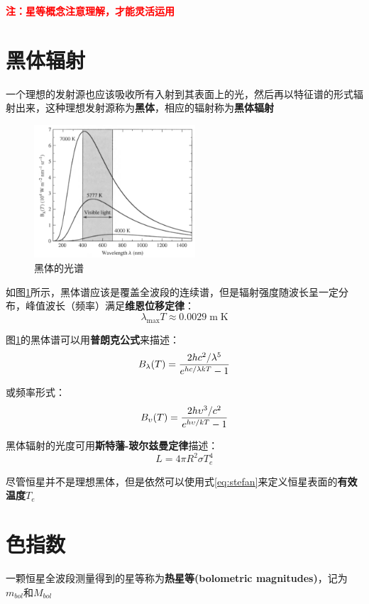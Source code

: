 {\bf \textcolor{red}{注：星等概念注意理解，才能灵活运用}}

\section{黑体辐射}
一个理想的发射源也应该吸收所有入射到其表面上的光，然后再以特征谱的形式辐射出来，这种理想发射源称为{\bf 黑体}，相应的辐射称为{\bf 黑体辐射}
\begin{figure}[hbt]
  \centering
  \includegraphics[width=6cm]{chapters/03/blackbody}
  \caption{黑体的光谱}
  \label{fig:blackbody}
\end{figure}

如图\ref{fig:blackbody}所示，黑体谱应该是覆盖全波段的连续谱，但是辐射强度随波长呈一定分布，峰值波长（频率）满足{\bf 维恩位移定律}：
\begin{equation}
  \lambda_\mathrm{max}T\approx0.0029\;\mathrm{m\;K}
\end{equation}

图\ref{fig:blackbody}的黑体谱可以用{\bf 普朗克公式}来描述：
\begin{equation}
  B_\lambda(T)={2hc^2/\lambda^5 \over e^{hc/\lambda kT}-1}
  \label{eq:planck}
\end{equation}

或频率形式：
\begin{equation}
  B_\upsilon (T)={2h\upsilon^3/c^2 \over e^{h\upsilon/kT}-1}
\end{equation}

黑体辐射的光度可用{\bf 斯特藩-玻尔兹曼定律}描述：
\begin{equation}
  L=4\pi R^2\sigma T^4_e
  \label{eq:stefan}
\end{equation}

尽管恒星并不是理想黑体，但是依然可以使用式\ref{eq:stefan}来定义恒星表面的{\bf 有效温度}$T_e$

\section{色指数}
一颗恒星全波段测量得到的星等称为{\bf 热星等(bolometric magnitudes)}，记为$m_{bol}$和$M_{bol}$

